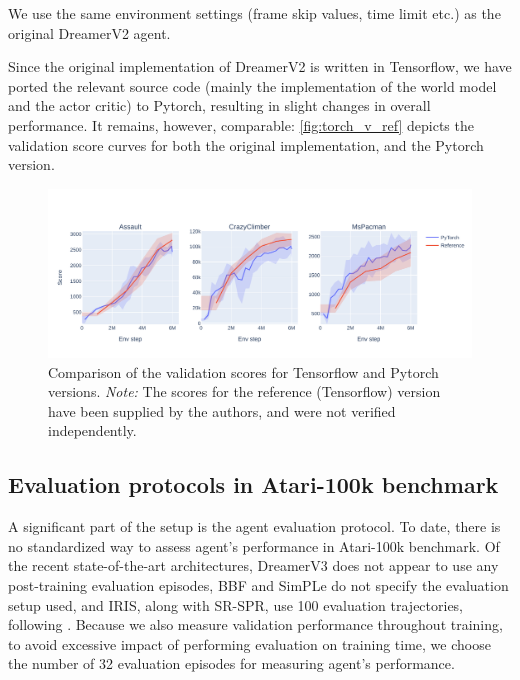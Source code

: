 \documentclass[en]{pracamgr}
\newcommand{\figurewidth}{\linewidth}
\begin{document}
We use the same environment settings (frame skip values, time limit etc.) as the original DreamerV2 agent.

Since the original implementation of DreamerV2 is written in Tensorflow, we have ported the relevant source code (mainly the implementation of the world model and the actor critic) to Pytorch, resulting in slight changes in overall performance. It remains, however, comparable: \autoref{fig:torch_v_ref} depicts the validation score curves for both the original implementation, and the Pytorch version.

\begin{figure}
  \centering
  \includegraphics[width=\figurewidth,height=\paperheight,keepaspectratio]{assets/torch_v_ref.pdf}
  \caption{Comparison of the validation scores for Tensorflow and Pytorch versions. \emph{Note:} The scores for the reference (Tensorflow) version have been supplied by the authors, and were not verified independently.}
  \label{fig:torch_v_ref}
\end{figure}

\subsection{Evaluation protocols in Atari-100k benchmark}

A significant part of the setup is the agent evaluation protocol. To date, there is no standardized way to assess agent's performance in Atari-100k benchmark. Of the recent state-of-the-art architectures, DreamerV3 does not appear to use any post-training evaluation episodes, BBF and SimPLe do not specify the evaluation setup used, and IRIS, along with SR-SPR, use 100 evaluation trajectories, following \autocite{agarwalDeepReinforcementLearning2022}. Because we also measure validation performance throughout training, to avoid excessive impact of performing evaluation on training time, we choose the number of 32 evaluation episodes for measuring agent's performance.
\end{document}
